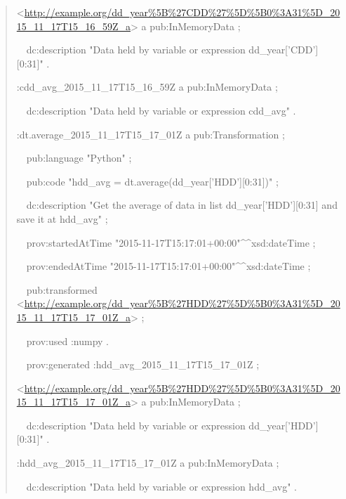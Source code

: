 \begin{quotation}
	\noindent<\url{http://example.org/dd_year%5B%27CDD%27%5D%5B0%3A31%5D_2015_11_17T15_16_59Z_a}> a pub:InMemoryData ;

	\noindent\ \ dc:description "Data held by variable or expression dd\_year['CDD'][0:31]" .
	
	\noindent:cdd\_avg\_2015\_11\_17T15\_16\_59Z a pub:InMemoryData ;

	\noindent\ \ dc:description "Data held by variable or expression cdd\_avg" .
		
	\noindent:dt.average\_2015\_11\_17T15\_17\_01Z a pub:Transformation ;
	
	\noindent\ \ pub:language "Python" ;
	
	\noindent\ \ pub:code "hdd\_avg = dt.average(dd\_year['HDD'][0:31])" ;
	
	\noindent\ \ dc:description "Get the average of data in list dd\_year['HDD'][0:31] and save it at hdd\_avg" ;
	
	\noindent\ \ prov:startedAtTime "2015-11-17T15:17:01+00:00"\^{}\^{}xsd:dateTime ;
	
	\noindent\ \ prov:endedAtTime "2015-11-17T15:17:01+00:00"\^{}\^{}xsd:dateTime ;
	
	\noindent\ \ pub:transformed <\url{http://example.org/dd_year%5B%27HDD%27%5D%5B0%3A31%5D_2015_11_17T15_17_01Z_a}> ;
		
	\noindent\ \ prov:used :numpy .
	
	\noindent\ \ prov:generated :hdd\_avg\_2015\_11\_17T15\_17\_01Z ;
	
	\noindent<\url{http://example.org/dd_year%5B%27HDD%27%5D%5B0%3A31%5D_2015_11_17T15_17_01Z_a}> a pub:InMemoryData ;
	
	\noindent\ \ dc:description "Data held by variable or expression dd\_year['HDD'][0:31]" .
	
	\noindent:hdd\_avg\_2015\_11\_17T15\_17\_01Z a pub:InMemoryData ;
	
	\noindent\ \ dc:description "Data held by variable or expression hdd\_avg" .	
\end{quotation}


